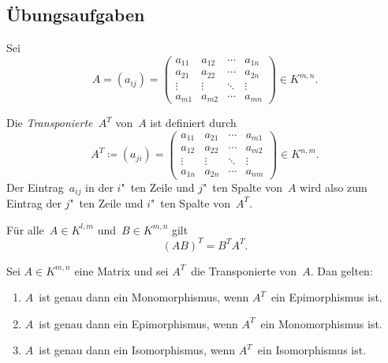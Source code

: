 \documentclass[a4paper]{article}
\begin{document}


\subsection{Übungsaufgaben}

\begin{definition}[Transponierte]
    Sei
    \begin{equation*}
        A = (a_{ij}) =
        \begin{pmatrix}
            a_{11} & a_{12} & \cdots & a_{1n} \\
            a_{21} & a_{22} & \cdots & a_{2n} \\
            \vdots & \vdots & \ddots & \vdots \\
            a_{m1} & a_{m2} & \cdots & a_{mn}
        \end{pmatrix}
        \in K^{m,n}.
    \end{equation*}

    Die \emph{Transponierte~$A^T$} von~$A$ ist definiert durch
    \begin{equation*}
        A^T \coloneqq (a_{ji}) =
        \begin{pmatrix}
            a_{11} & a_{21} & \cdots & a_{m1} \\
            a_{12} & a_{22} & \cdots & a_{m2} \\
            \vdots & \vdots & \ddots & \vdots \\
            a_{1n} & a_{2n} & \cdots & a_{nm}
        \end{pmatrix}
        \in K^{n,m}.
    \end{equation*}
    Der Eintrag~$a_{ij}$ in der $i$"~ten Zeile und $j$"~ten Spalte von~$A$ wird also zum Eintrag der $j$"~ten Zeile und $i$"~ten Spalte von~$A^T$.
\end{definition}

\begin{lemma}
    Für alle~$A \in K^{l,m}$ und~$B \in K^{m,n}$ gilt
    \begin{equation*}
        (AB)^T = B^TA^T.
    \end{equation*}
\end{lemma}

\begin{lemma}
    Sei $A \in K^{m,n}$ eine Matrix und sei $A^T$~die Transponierte von~$A$. Dan gelten:
    \begin{enumerate}
        \item $A$~ist genau dann ein Monomorphismus, wenn $A^T$~ein Epimorphismus ist.
        \item $A$~ist genau dann ein Epimorphismus, wenn $A^T$~ein Monomorphismus ist.
        \item $A$~ist genau dann ein Isomorphismus, wenn $A^T$~ein Isomorphismus ist.
    \end{enumerate}
\end{lemma}
\end{document}
